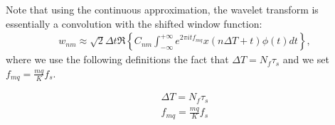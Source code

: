 \documentclass{article}
\begin{document}
Note that using the continuous approximation, the wavelet transform is essentially a convolution with the shifted window function:
\begin{eqnarray}
\label{eq:wavelet_transform_continuous}
    w_{n m} \approx \sqrt{2} \Delta t \Re \left\{C_{n m} \int_{-\infty}^{+\infty} e^{2 \pi i t f_{mq}} x(n \Delta T + t) \phi(t) dt\right\},
\end{eqnarray}
where we use the following definitions the fact that $\Delta T = N_f \tau_s$ and we set $f_{mq} = \frac{mq}{K}f_s$. 

\begin{eqnarray}
  \Delta T = N_f \tau_s \label{eq:dT_tau}\\
  f_{mq} = \frac{mq}{K}f_s\label{eq:fmq}
\end{eqnarray}
\end{document}
